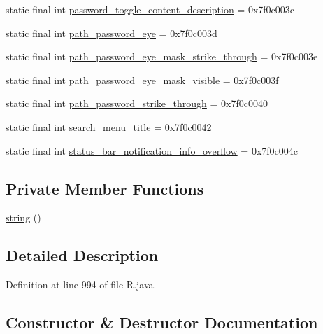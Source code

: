 \begin{DoxyCompactItemize}
\item 
static final int \mbox{\hyperlink{classandroid_1_1support_1_1design_1_1_r_1_1string_a4527efd2dc09f2ef14dc5d29885af2d7}{password\+\_\+toggle\+\_\+content\+\_\+description}} = 0x7f0c003c
\item 
static final int \mbox{\hyperlink{classandroid_1_1support_1_1design_1_1_r_1_1string_aed1c555d135bf6222bcd81421426dc29}{path\+\_\+password\+\_\+eye}} = 0x7f0c003d
\item 
static final int \mbox{\hyperlink{classandroid_1_1support_1_1design_1_1_r_1_1string_a29a5c3f687b185da43894e42ce7815b4}{path\+\_\+password\+\_\+eye\+\_\+mask\+\_\+strike\+\_\+through}} = 0x7f0c003e
\item 
static final int \mbox{\hyperlink{classandroid_1_1support_1_1design_1_1_r_1_1string_a13989fd072bdc21662e0280689488412}{path\+\_\+password\+\_\+eye\+\_\+mask\+\_\+visible}} = 0x7f0c003f
\item 
static final int \mbox{\hyperlink{classandroid_1_1support_1_1design_1_1_r_1_1string_abc8635142311e1011a50dd2be868ce34}{path\+\_\+password\+\_\+strike\+\_\+through}} = 0x7f0c0040
\item 
static final int \mbox{\hyperlink{classandroid_1_1support_1_1design_1_1_r_1_1string_a5b51cc800abfd3edfc464432c67dade9}{search\+\_\+menu\+\_\+title}} = 0x7f0c0042
\item 
static final int \mbox{\hyperlink{classandroid_1_1support_1_1design_1_1_r_1_1string_ae7e600aba7d20d01b5e3b4ccc3847bc9}{status\+\_\+bar\+\_\+notification\+\_\+info\+\_\+overflow}} = 0x7f0c004c
\end{DoxyCompactItemize}
\subsection*{Private Member Functions}
\begin{DoxyCompactItemize}
\item 
\mbox{\hyperlink{classandroid_1_1support_1_1design_1_1_r_1_1string_af65fc1f3b3fb46afe266d6fbc8cc6b50}{string}} ()
\end{DoxyCompactItemize}


\subsection{Detailed Description}


Definition at line 994 of file R.\+java.



\subsection{Constructor \& Destructor Documentation}
\mbox{\label{classandroid_1_1support_1_1design_1_1_r_1_1string_af65fc1f3b3fb46afe266d6fbc8cc6b50}} 
